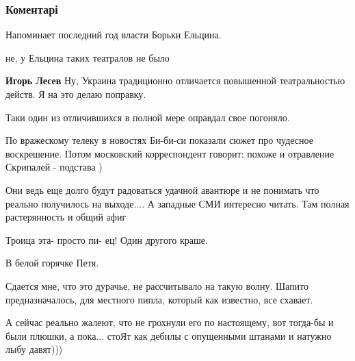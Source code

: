  
 
 
 
 
\subsubsection{Коментарі}

\begin{itemize} %
Напоминает последний год власти Борьки Ельцина.

\begin{itemize} %
не, у Ельцина таких театралов не было

\textbf{Игорь Лесев} Ну, Украина традиционно отличается повышенной театральностью действ. Я на это делаю поправку.
\end{itemize} %

Таки один из отличившихся в полной мере оправдал свое погоняло.


По вражескому телеку в новостях Би-би-си показали сюжет про чудесное
воскрешение. Потом московский корреспондент говорит: похоже и отравление
Скрипалей - подстава )


Они ведь еще долго будут радоваться удачной авантюре и не понимать что реально
получилось на выходе.... А западные СМИ интересно читать. Там полная
растерянность и общий афиг

Троица эта- просто пи- ец! Один другого краше.

В белой горячке Петя.


Сдается мне, что это дурачье, не рассчитывало на такую волну. Шапито
предназначалось, для местного пипла, который как известно, все схавает.

А сейчас реально жалеют, что не грохнули его по настоящему, вот тогда-бы и были
плюшки, а пока... стоЯт как дебилы с опущенными штанами и натужно лыбу давят)))

\end{itemize} %

